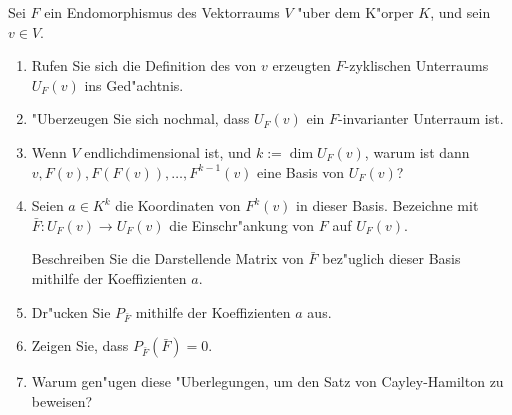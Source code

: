 \documentclass[a4,11pt]{article}
\begin{document}
\begin{aufgabe}[4 Punkte]
Sei $F$ ein Endomorphismus des Vektorraums $V$ "uber dem K"orper $K$,
und sein $v \in V$.
  
  \begin{enumerate}
  \item Rufen Sie sich die Definition des von $v$ erzeugten
    $F$-zyklischen Unterraums $U_F(v)$ ins Ged"achtnis.
  \item "Uberzeugen Sie sich nochmal, dass $U_F(v)$ ein
    $F$-invarianter Unterraum ist.
  \item Wenn $V$ endlichdimensional ist, und $k := \dim U_F(v)$, warum
    ist dann \\ $v, F(v), F(F(v)), \ldots, F^{k-1}(v)$ eine
    Basis von $U_F(v)$?
  \item Seien $a \in K^k$ die Koordinaten von $F^k(v)$ in dieser Basis.
    Bezeichne mit \\ $\bar F \colon U_F(v) \to U_F(v)$ die 
    Einschr"ankung von $F$ auf $U_F(v)$.
    
    Beschreiben Sie die Darstellende Matrix von $\bar F$ bez"uglich
    dieser Basis mithilfe der Koeffizienten $a$.
  \item Dr"ucken Sie $P_{\bar F}$ mithilfe der Koeffizienten $a$ aus.
  \item Zeigen Sie, dass $P_{\bar F}(\bar F) = 0$.
  \item Warum gen"ugen diese "Uberlegungen, um den Satz von
    Cayley-Hamilton zu beweisen?
\end{enumerate}

\end{aufgabe}
\end{document}
